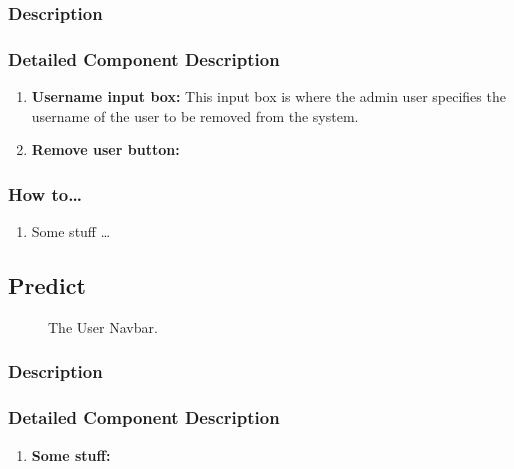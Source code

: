 \documentclass[14pt, a4paper]{article}
\begin{document}
	\subsubsection{Description} 
	\subsubsection{Detailed Component Description}
		\begin{enumerate}
			\item \textbf{Username input box:} This input box is where the admin user specifies the username of the user to be removed from the system.
			\item \textbf{Remove user button:}
		\end{enumerate}
	\subsubsection{How to\ldots}
		\begin{enumerate}
			\item Some stuff \ldots
		\end{enumerate}
\subsection{Predict}
	\begin{figure}[H]
		\centerline{}
		\caption{The User Navbar.}
  		\label{fig:navbar4}
	\end{figure}
	\subsubsection{Description}
	\subsubsection{Detailed Component Description}
		\begin{enumerate}
			\item \textbf{Some stuff:} 
		\end{enumerate}
\end{document}
